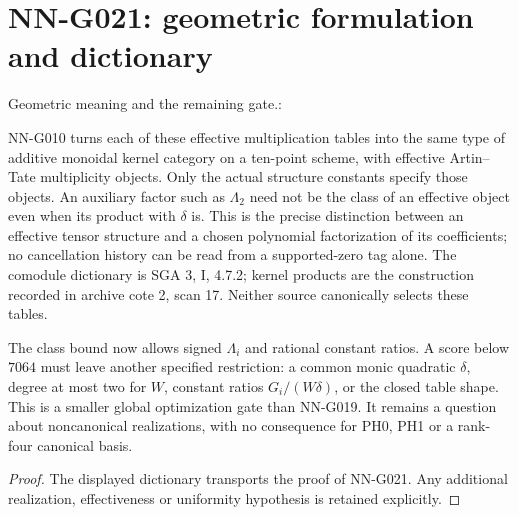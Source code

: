\section{NN-G021: geometric formulation and dictionary}
\begin{geometricstatement}[NN-G021]
Geometric meaning and the remaining gate.:

NN-G010 turns each of these effective multiplication tables
into the same type of additive monoidal kernel category on
a ten-point scheme, with effective Artin--Tate multiplicity
objects. Only the actual structure constants specify those
objects. An auxiliary factor such as $\Lambda_2$ need not
be the class of an effective object even when its product
with $\delta$ is. This is the precise distinction between
an effective tensor structure and a chosen polynomial
factorization of its coefficients; no cancellation history
can be read from a supported-zero tag alone.
The comodule dictionary is SGA 3, I, 4.7.2; kernel products
are the construction recorded in archive cote 2, scan 17.
Neither source canonically selects these tables.

The class bound now allows signed $\Lambda_i$ and rational
constant ratios. A score below $7064$ must leave another
specified restriction: a common monic quadratic $\delta$,
degree at most two for $W$, constant ratios $G_i/(W\delta)$,
or the closed table shape. This is a smaller global
optimization gate than NN-G019. It remains a question
about noncanonical realizations, with no consequence for
PH0, PH1 or a rank-four canonical basis.


\end{geometricstatement}
\begin{proof} The displayed dictionary transports the proof of NN-G021. Any additional realization, effectiveness or uniformity hypothesis is retained explicitly.\end{proof}


